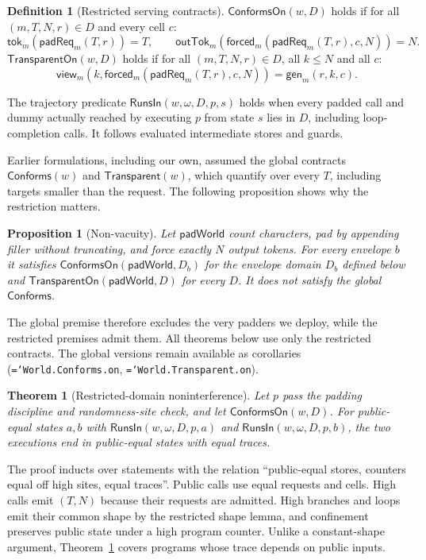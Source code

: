\documentclass[preprint,12pt]{elsarticle}
\newtheorem{theorem}{Theorem}
\newtheorem{proposition}{Proposition}
\theoremstyle{definition}
\newtheorem{definition}{Definition}
\newcommand{\code}[1]{\texttt{\hyphenchar\font=`\-#1}}
\begin{document}
\begin{definition}[Restricted serving contracts]
$\mathsf{ConformsOn}(w,D)$ holds if for all $(m,T,N,r)\in D$ and every cell $c$:
\[
\mathsf{tok}_m(\mathsf{padReq}_m(T,r))=T,\qquad
\mathsf{outTok}_m(\mathsf{forced}_m(\mathsf{padReq}_m(T,r),c,N))=N.
\]
$\mathsf{TransparentOn}(w,D)$ holds if for all $(m,T,N,r)\in D$, all $k\leq N$ and
all $c$:
\[
\mathsf{view}_m(k,\mathsf{forced}_m(\mathsf{padReq}_m(T,r),c,N))=\mathsf{gen}_m(r,k,c).
\]
\end{definition}

The trajectory predicate $\mathsf{RunsIn}(w,\omega,D,p,s)$ holds when every padded
call and dummy actually reached by executing $p$ from state $s$ lies in $D$,
including loop-completion calls. It follows evaluated intermediate stores and
guards.

Earlier formulations, including our own, assumed the global contracts
$\mathsf{Conforms}(w)$ and $\mathsf{Transparent}(w)$, which quantify over every
$T$, including targets smaller than the request. The following proposition shows
why the restriction matters.

\begin{proposition}[Non-vacuity]\label{prop:nonvacuous}
Let $\mathsf{padWorld}$ count characters, pad by appending filler without
truncating, and force exactly $N$ output tokens. For every envelope $b$ it
satisfies $\mathsf{ConformsOn}(\mathsf{padWorld},D_b)$ for the envelope domain
$D_b$ defined below and $\mathsf{TransparentOn}(\mathsf{padWorld},D)$ for every
$D$. It does not satisfy the global $\mathsf{Conforms}$.
\end{proposition}

The global premise therefore excludes the very padders we deploy, while the
restricted premises admit them. All theorems below use only the restricted
contracts. The global versions remain available as corollaries
(\code{World.Conforms.on}, \code{World.Transparent.on}).

\begin{theorem}[Restricted-domain noninterference]\label{thm:ni-on}
Let $p$ pass the padding discipline and randomness-site check, and let
$\mathsf{ConformsOn}(w,D)$. For public-equal states $a,b$ with
$\mathsf{RunsIn}(w,\omega,D,p,a)$ and $\mathsf{RunsIn}(w,\omega,D,p,b)$, the two
executions end in public-equal states with equal traces.
\end{theorem}

The proof inducts over statements with the relation ``public-equal stores,
counters equal off high sites, equal traces''. Public calls use equal requests and
cells. High calls emit $(T,N)$ because their requests are admitted. High branches
and loops emit their common shape by the restricted shape lemma, and confinement
preserves public state under a high program counter. Unlike a constant-shape
argument, Theorem~\ref{thm:ni-on} covers programs whose trace depends on public
inputs.
\end{document}
